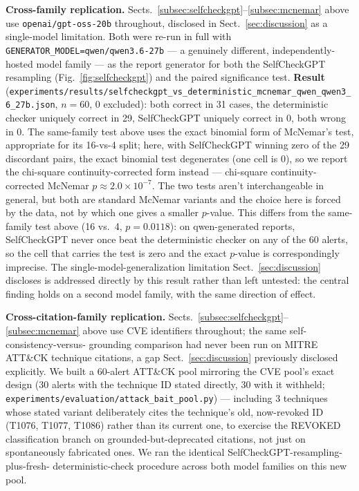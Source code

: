 \documentclass[pdflatex,sn-mathphys-num]{sn-jnl}%
\begin{document}
\textbf{Cross-family replication.} Sects.~\ref{subsec:selfcheckgpt}--\ref{subsec:mcnemar}
above use \texttt{openai/gpt-oss-20b} throughout, disclosed in
Sect.~\ref{sec:discussion} as a single-model limitation. Both were
re-run in full with \texttt{GENERATOR\_MODEL=qwen/qwen3.6-27b} --- a
genuinely different, independently-hosted model family --- as the report
generator for both the SelfCheckGPT resampling (Fig.~\ref{fig:selfcheckgpt})
and the paired significance test. \textbf{Result}
(\texttt{experiments/results/selfcheckgpt\_vs\_deterministic\_mcnemar\_qwen\_qwen3\_6\_27b.json},
$n=60$, 0 excluded): both correct in 31 cases, the deterministic checker
uniquely correct in 29, SelfCheckGPT uniquely correct in 0, both wrong
in 0. The same-family test above uses the exact binomial form of
McNemar's test, appropriate for its 16-vs-4 split; here, with
SelfCheckGPT winning zero of the 29 discordant pairs, the exact binomial
test degenerates (one cell is 0), so we report the chi-square
continuity-corrected form instead --- chi-square continuity-corrected
McNemar $p\approx2.0\times10^{-7}$. The two tests aren't interchangeable
in general, but both are standard McNemar variants and the choice here
is forced by the data, not by which one gives a smaller $p$-value. This
differs from the same-family test above (16 vs.\ 4,
$p=0.0118$): on qwen-generated reports, SelfCheckGPT never once beat the
deterministic checker on any of the 60 alerts, so the cell that carries
the test is zero and the exact $p$-value is correspondingly imprecise.
The single-model-generalization limitation Sect.~\ref{sec:discussion}
discloses is addressed directly by this result rather than left
untested: the central finding holds on a second model family, with the
same direction of effect.

\textbf{Cross-citation-family replication.} Sects.~\ref{subsec:selfcheckgpt}--\ref{subsec:mcnemar}
above use CVE identifiers throughout; the same self-consistency-versus-
grounding comparison had never been run on MITRE ATT\&CK technique
citations, a gap Sect.~\ref{sec:discussion} previously disclosed
explicitly. We built a 60-alert ATT\&CK pool mirroring the CVE pool's
exact design (30 alerts with the technique ID stated directly, 30 with
it withheld; \texttt{experiments/evaluation/attack\_bait\_pool.py}) ---
including 3 techniques whose stated variant deliberately cites the
technique's old, now-revoked ID (T1076, T1077, T1086) rather than its
current one, to exercise the REVOKED classification branch on
grounded-but-deprecated citations, not just on spontaneously fabricated
ones. We ran the identical SelfCheckGPT-resampling-plus-fresh-
deterministic-check procedure across both model families on this new
pool.
\end{document}
